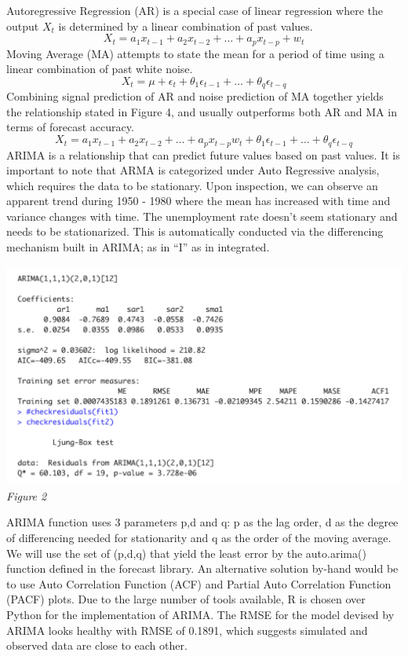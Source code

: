 \documentclass{article}
\begin{document}
	Autoregressive Regression (AR) is a special case of linear regression where the output $X_t$ is determined by a linear combination of past values.
	\begin{equation}
		X_t = a_1 x_{t-1} +a_2 x_{t-2} + \dots +a_p x_{t-p} +w_t 
	\end{equation}
	Moving Average (MA) attempts to state the mean for a period of time using a linear combination of past white noise. 
	\begin{equation}
		 X_t = \mu + \epsilon_t + \theta_1 \epsilon_{t-1} + \dots + \theta_q \epsilon_{t-q}
	\end{equation}
	Combining signal prediction of AR and noise prediction of MA together yields the relationship stated in Figure 4, and usually outperforms both AR and MA in terms of forecast accuracy. 
	\begin{equation}
		X_t = a_1 x_{t-1} +a_2 x_{t-2} + \dots +a_p x_{t-p}w_t +  \theta_1 \epsilon_{t-1} + \dots + \theta_q \epsilon_{t-q}
   	\end{equation}
	   ARIMA is a relationship that can predict future values based on past values. It is important to note that ARMA is categorized under Auto Regressive analysis, which requires the data to be stationary. Upon inspection, we can observe an apparent trend during 1950 - 1980 where the mean has increased with time and variance changes with time.  The unemployment rate doesn’t seem stationary and needs to be stationarized. This is automatically conducted via the differencing mechanism built in ARIMA; as in “I” as in integrated.
	   \begin{center}
			\includegraphics[width=1\textwidth]{assets/arima.png}
			\textit{Figure 2}
		\end{center}

		ARIMA function uses 3 parameters p,d and q: p as the lag order, d as the degree of differencing needed for stationarity and q as the order of the moving average. We will use the set of (p,d,q) that yield the least error by the auto.arima() function defined in the forecast library. An alternative solution by-hand would be to use Auto Correlation Function (ACF) and Partial Auto Correlation Function (PACF) plots. Due to the large number of tools available, R is chosen over Python for the implementation of ARIMA. The RMSE for the model devised by ARIMA looks healthy with RMSE of 0.1891, which suggests simulated and observed data are close to each other. 
		
\end{document}
